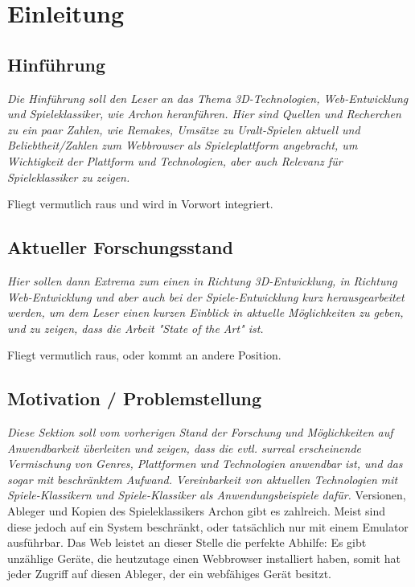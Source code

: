 \chapter{Einleitung}
\label{cha:Einleitung}

\section{Hinführung}
\label{sec:hinfuhrung}

\emph{Die Hinführung soll den Leser an das Thema 3D-Technologien, Web-Entwicklung und Spieleklassiker, wie Archon heranführen. Hier sind Quellen und Recherchen zu ein paar Zahlen, wie Remakes, Umsätze zu Uralt-Spielen aktuell und Beliebtheit/Zahlen zum Webbrowser als Spieleplattform angebracht, um Wichtigkeit der Plattform und Technologien, aber auch Relevanz für Spieleklassiker zu zeigen.}

Fliegt vermutlich raus und wird in Vorwort integriert.

\section{Aktueller Forschungsstand}
\label{sec:aktueller_forschungsstand}

\emph{Hier sollen dann Extrema zum einen in Richtung 3D-Entwicklung, in Richtung Web-Entwicklung und aber auch bei der Spiele-Entwicklung kurz herausgearbeitet werden, um dem Leser einen kurzen Einblick in aktuelle Möglichkeiten zu geben, und zu zeigen, dass die Arbeit "State of the Art" ist.}

Fliegt vermutlich raus, oder kommt an andere Position.

\section{Motivation / Problemstellung}
\label{sec:motivation}
\emph{ Diese Sektion soll vom vorherigen Stand der Forschung und Möglichkeiten auf Anwendbarkeit überleiten und zeigen, dass die evtl. surreal erscheinende Vermischung von Genres, Plattformen und Technologien anwendbar ist, und das sogar mit beschränktem Aufwand. Vereinbarkeit von aktuellen Technologien mit Spiele-Klassikern und Spiele-Klassiker als Anwendungsbeispiele dafür.}
Versionen, Ableger und Kopien des Spieleklassikers Archon gibt es zahlreich. Meist sind diese jedoch auf ein System beschränkt, oder tatsächlich nur mit einem Emulator ausführbar. Das Web leistet an dieser Stelle die perfekte Abhilfe: Es gibt unzählige Geräte, die heutzutage einen Webbrowser installiert haben, somit hat jeder Zugriff auf diesen Ableger, der ein webfähiges Gerät besitzt.

